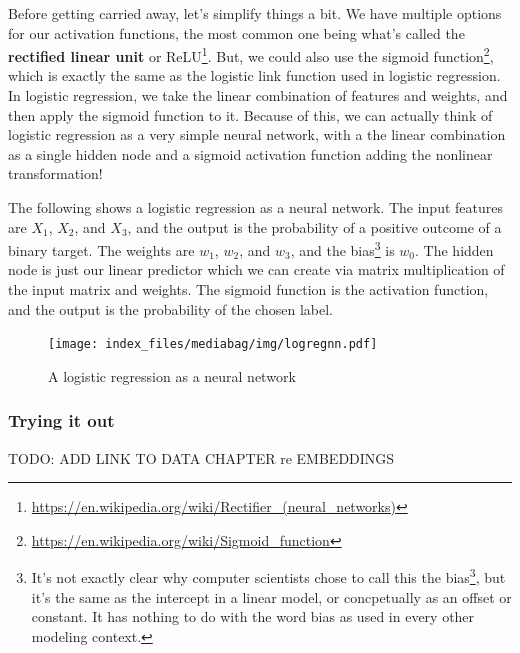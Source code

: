 \documentclass[
  letterpaper,
]{krantz}
\DeclareRobustCommand{\href}[2]{#2\footnote{\url{#1}}}
\begin{document}
Before getting carried away, let's simplify things a bit. We have
multiple options for our activation functions, the most common one being
what's called the \textbf{rectified linear unit} or
\href{https://en.wikipedia.org/wiki/Rectifier_(neural_networks)}{ReLU}.
But, we could also use the
\href{https://en.wikipedia.org/wiki/Sigmoid_function}{sigmoid function},
which is exactly the same as the logistic link function used in logistic
regression. In logistic regression, we take the linear combination of
features and weights, and then apply the sigmoid function to it. Because
of this, we can actually think of logistic regression as a very simple
neural network, with a the linear combination as a single hidden node
and a sigmoid activation function adding the nonlinear transformation!

The following shows a logistic regression as a neural network. The input
features are \(X_1\), \(X_2\), and \(X_3\), and the output is the
probability of a positive outcome of a binary target. The weights are
\(w_1\), \(w_2\), and \(w_3\), and the bias\footnote{It's not exactly
  clear
  \href{https://stats.stackexchange.com/questions/511726/different-usage-of-the-term-bias-in-stats-machine-learning}{why
  computer scientists chose to call this the bias}, but it's the same as
  the intercept in a linear model, or concpetually as an offset or
  constant. It has nothing to do with the word bias as used in every
  other modeling context.} is \(w_0\). The hidden node is just our
linear predictor which we can create via matrix multiplication of the
input matrix and weights. The sigmoid function is the activation
function, and the output is the probability of the chosen label.

\hypertarget{logistic-nn-graph}{}

\begin{figure}

{\centering \texttt{[image: index\_files/mediabag/img/logregnn.pdf]}

}

\caption{A logistic regression as a neural network}

\end{figure}

\subsubsection{Trying it out}\label{trying-it-out}

TODO: ADD LINK TO DATA CHAPTER re EMBEDDINGS
\end{document}
